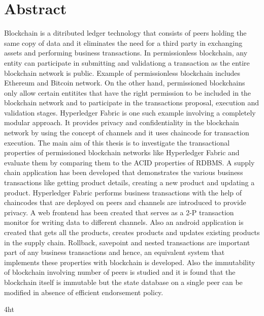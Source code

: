 \documentclass[
  a4paper,  %
  twoside,  %
  bibliography=totoc,
  headsepline,
  cleardoublepage=empty,
  parskip=half,
  draft=false
]{scrbook}
\begin{document}
  \section*{Abstract}
\fi
Blockchain is a ditributed ledger technology that consists of peers holding the same copy of data and it eliminates the need for a third party in exchanging assets and performing business transactions. In permissionless blockchain, any entity can participate in submitting and validationg a transaction as the entire blockchain network is public. Example of permissionless blockchain includes Ethereum and Bitcoin network. On the other hand, permissioned blockchains only allow certain entitites that have the right permission to be included in the blockchain network and to participate in the transactions proposal, execution and validation stages. Hyperledger Fabric is one such example involving a completely modular approach. It provides privacy and confidentiality in the blockchain network by using the concept of channels and it uses chaincode for transaction execution. \linebreak \linebreak
The main aim of this thesis is to investigate the transactional properties of permissioned blockchain networks like
Hyperledger Fabric and evaluate them by comparing them to the ACID properties of RDBMS. A supply chain application has been developed that demonstrates the various business transactions like getting product details, creating a new product and updating a product. Hyperledger Fabric performs business transactions with the help of chaincodes that are deployed on peers and channels are introduced to provide privacy. A web frontend has been created that serves as a 2-P transaction monitor for writing data to different channels. Also an android application is created that gets all the products, creates products and updates existing products in the supply chain. Rollback, savepoint and nested transactions are important part of any business transactions and hence, an equivalent system that implements these properties with blockchain is developed. Also the immutability of blockchain involving number of peers is studied and it is found that the blockchain itself is immutable but the state database on a single peer can be modified in absence of efficient endorsement policy. 

\cleardoublepage



\iftex4ht
\else
\fi
\end{document}
